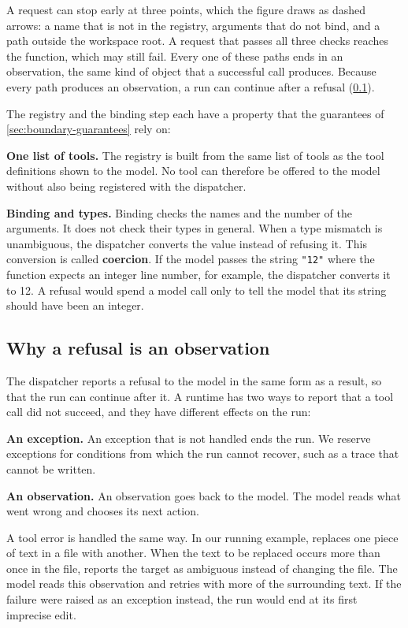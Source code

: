 A request can stop early at three points, which the figure draws as dashed arrows: a name that is not
in the registry, arguments that do not bind, and a path outside the workspace root. A request that
passes all three checks reaches the function, which may still fail. Every one of these paths ends in
an observation, the same kind of object that a successful call produces. Because every path produces
an observation, a run can continue after a refusal (\cref{sec:boundary-refusal}).

The registry and the binding step each have a property that the guarantees of
\cref{sec:boundary-guarantees} rely on:
\bi
\item \textbf{One list of tools.} The registry is built from the same list of tools as the tool
definitions shown to the model. No tool can therefore be offered to the model without also being
registered with the dispatcher.
\item \textbf{Binding and types.} Binding checks the names and the number of the arguments. It does
not check their types in general. When a type mismatch is unambiguous, the dispatcher converts the
value instead of refusing it. This conversion is called \textbf{coercion}. If the model passes the
string \texttt{"12"} where the function expects an integer line number, for example, the dispatcher
converts it to 12. A refusal would spend a model call only to tell the model that its string should
have been an integer.
\ei

\subsection{Why a refusal is an observation}
\label{sec:boundary-refusal}

The dispatcher reports a refusal to the model in the same form as a result, so that the run can
continue after it. A runtime has two ways to report that a tool call did not succeed, and they have
different effects on the run:
\bi
\item \textbf{An exception.} An exception that is not handled ends the run. We reserve exceptions for
conditions from which the run cannot recover, such as a trace that cannot be written.
\item \textbf{An observation.} An observation goes back to the model. The model reads what went wrong
and chooses its next action.
\ei

A tool error is handled the same way. In our running example,  replaces one piece of
text in a file with another. When the text to be replaced occurs more than once in the file,
 reports the target as ambiguous instead of changing the file. The model reads this
observation and retries with more of the surrounding text. If the failure were raised as an
exception instead, the run would end at its first imprecise edit.

